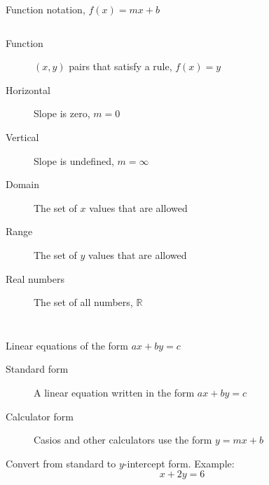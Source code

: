 \begin{frame}{Function notation, $f(x)=mx+b$}
  \begin{columns}
    \begin{description}
      \item[Function] $(x,y)$ pairs that satisfy a rule, $f(x)=y$
      \item[Horizontal] Slope is zero, $m=0$
      \item[Vertical] Slope is undefined, $m=\infty$
      \item[Domain] The set of $x$ values that are allowed
      \item[Range] The set of $y$ values that are allowed
      \item[Real numbers] The set of all numbers, $\mathbb{R}$
    \end{description}
    \begin{flushright}
    \end{flushright}
  \end{columns}
\end{frame}

\begin{frame}{Linear equations of the form $ax+by=c$}
    \begin{description}
      \item[Standard form] A linear equation written in the form $ax+by=c$
      \item[Calculator form] Casios and other calculators use the form $y=mx+b$
    \end{description} \vspace{1cm}
Convert from standard to $y$-intercept form. Example: 
  $$x+2y=6$$
\end{frame}

